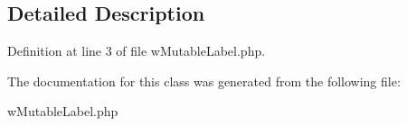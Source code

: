 \subsection{Detailed Description}


Definition at line 3 of file wMutableLabel.php.



The documentation for this class was generated from the following file:\begin{DoxyCompactItemize}
\item 
wMutableLabel.php\end{DoxyCompactItemize}
